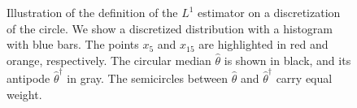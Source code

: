 \begin{figure}[h!]
\begin{tikzpicture}

\end{tikzpicture}


\caption{Illustration of the definition of the $L^1$ estimator on a discretization of the circle. We show a discretized distribution with a histogram with blue bars. The points $x_5$ and $x_{15}$ are highlighted in red and orange, respectively. The circular median $\widehat{\theta}$ is shown in black, and its antipode $\widehat{\theta}^\dagger$ in gray. The semicircles between $\widehat{\theta}$ and $\widehat{\theta}^\dagger$ carry equal weight.}
\end{figure}

